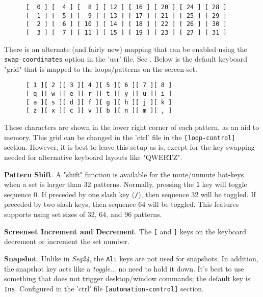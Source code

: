    \begin{verbatim}
      [  0 ] [  4 ] [  8 ] [ 12 ] [ 16 ] [ 20 ] [ 24 ] [ 28 ]
      [  1 ] [  5 ] [  9 ] [ 13 ] [ 17 ] [ 21 ] [ 25 ] [ 29 ]
      [  2 ] [  6 ] [ 10 ] [ 14 ] [ 18 ] [ 22 ] [ 26 ] [ 30 ]
      [  3 ] [  7 ] [ 11 ] [ 15 ] [ 19 ] [ 23 ] [ 27 ] [ 31 ]
   \end{verbatim}

   There is an alternate (and fairly new) mapping that can be enabled
   using the \texttt{swap-coordinates} option in the 'usr' file.
   See .
   Below is the default keyboard "grid" that is
   mapped to the loops/patterns on the screen-set.

   \begin{verbatim}
      [ 1 ][ 2 ][ 3 ][ 4 ][ 5 ][ 6 ][ 7 ][ 8 ]
      [ q ][ w ][ e ][ r ][ t ][ y ][ u ][ i ]
      [ a ][ s ][ d ][ f ][ g ][ h ][ j ][ k ]
      [ z ][ x ][ c ][ v ][ b ][ n ][ m ][ , ]
   \end{verbatim}

   These characters are shown in the lower right corner of each
   pattern, as an aid to memory.
   This grid can be changed in the 'ctrl' file in the
   \texttt{[loop-control]} section.
   However, it is best to leave this setup as is, except for the key-swapping
   needed for alternative keyboard layouts like "QWERTZ".

   \textbf{Pattern Shift}.
   A "shift" function is available for the
   mute/unmute hot-keys when a set is larger than 32 patterns.
   Normally, pressing the \texttt{1} key will toggle
   sequence 0.  If preceded by one slash key (\texttt{/}), then sequence 32
   will be toggled.  If preceded by two slash keys, then sequence 64 will be
   toggled.  This features supports using set sizes of 32, 64, and 96 patterns.

   \index{keys![}
   \textbf{Screenset Increment and Decrement}.
   The \texttt{[} and
   \index{keys!]}
   \texttt{]} keys on the keyboard decrement or increment the set number.

   \textbf{Snapshot}.
   Unlike in \textsl{Seq24}, the \texttt{Alt} keys are not used for snapshots.
   In addition, the snapshot key acts like a \textsl{toggle}...
   no need to hold it down.
   It's best to use something that does not trigger desktop/window
   commands; the default key is \texttt{Ins}.
   Configured in the 'ctrl' file \texttt{[automation-control]} section.

